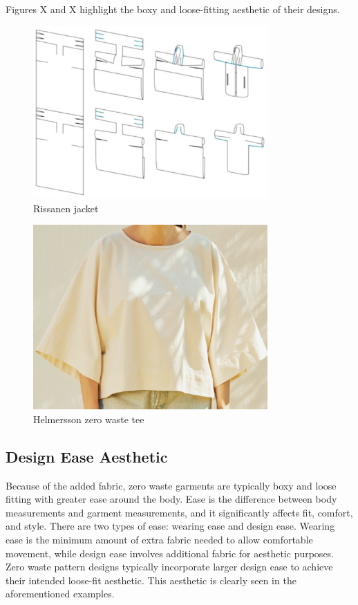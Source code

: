 Figures X and X highlight the boxy and loose-fitting aesthetic of their designs.
\begin{figure} [H]
    \centering
    \includegraphics[width=0.8\textwidth]{Images/rissanen jacket.png}
    \caption{Rissanen jacket}
\end{figure}
\begin{figure} [H]
    \centering
    \includegraphics[width=0.8\textwidth]{Images/bh tee.png}
    \caption{Helmersson zero waste tee}
\end{figure}

\subsection{Design Ease Aesthetic}
Because of the added fabric, zero waste garments are typically boxy and loose fitting with greater ease around the body. Ease is the difference between body measurements and garment measurements, and it significantly affects fit, comfort, and style. There are two types of ease: wearing ease and design ease. Wearing ease is the minimum amount of extra fabric needed to allow comfortable movement, while design ease involves additional fabric for aesthetic purposes. Zero waste pattern designs typically incorporate larger design ease to achieve their intended loose-fit aesthetic. This aesthetic is clearly seen in the aforementioned examples.

